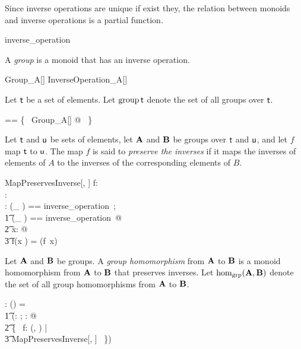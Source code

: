 \documentclass{amsart}
\begin{document}
\begin{remark}
Since inverse operations are unique if exist they, the relation between monoids and inverse operations
is a partial function.

\begin{zed}
	inverse\_operation \in \monoid \setT \pfun \setT \pfun \setT
\end{zed}

\end{remark}

A {\em group} is a monoid that has an inverse operation.
\begin{schema}{Group\_A}[\genT]
	InverseOperation\_A[\genT]
\end{schema}

Let $\mathsf{t}$ be a set of elements.
Let $\operatorname{group} \mathsf{t}$ denote the set of all groups over $\mathsf{t}$.
\begin{zed}
	\group \genT == \{~ Group\_A[\genT] @ \strucA ~\}
\end{zed}

Let $\mathsf{t}$ and $\mathsf{u}$ be sets of elements,
let $\mathbf{A}$ and $\mathbf{B}$ be groups over $\mathsf{t}$ and $\mathsf{u}$, 
and let $f$ map $\mathsf{t}$ to $\mathsf{u}$.
The map $f$ is said to {\em preserve the inverses} if it maps the inverses of elements of $A$
to the inverses of the corresponding elements of $B$.
\begin{schema}{MapPreservesInverse}[\genT, \genU]
	f: \genT \pfun \genU \\
	\strucA: \group \genT \\	
	\strucB: \group \genU
\where
	\LET (\_ \invG) == inverse\_operation~\strucA; \\
	\t1	(\_ \daggerG) == inverse\_operation~\strucB @ \\
	\t2		\forall x: \genT @ \\
	\t3			f(x \invG) = (f~x) \daggerG
\end{schema}

Let $\mathbf{A}$ and $\mathbf{B}$ be groups.
A {\em group homomorphism} from $\mathbf{A}$ to $\mathbf{B}$ is a monoid homomorphism
from $\mathbf{A}$ to $\mathbf{B}$ that preserves inverses.
Let $\operatorname{hom_{grp}}(\mathbf{A}, \mathbf{B})$ denote the set of all group homomorphisms from $\mathbf{A}$ to $\mathbf{B}$.
\begin{gendef}[\genT, \genU]
	\homGroup: \group \genT \cross \group \genU \fun \power (\genT \fun \genU)
\where
	\homGroup = \\
	\t1	(\lambda \strucA: \group \genT; \strucB: \group \genU @ \\
	\t2		\{~ f: \homMonoid(\strucA, \strucB) | \\
	\t3			MapPreservesInverse[\genT, \genU] ~\})
\end{gendef}
\end{document}
